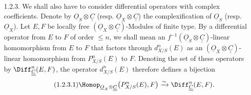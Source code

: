 1.2.3. We shall also have to consider differential operators with complex coefficients. Denote by $\underline{O}_S\otimes\underline{\underline{C}}$ (resp. $\underline{O}_X\otimes\underline{\underline{C}}$) the complexification of $\underline{O}_S$ (resp. $\underline{O}_X$). Let $E,F$ be locally free $(\underline{O}_X\otimes\underline{\underline{C}})$-Modules of finite type. By a differential operator from $E$ to $F$ of order $\le n$, we shall mean an $f^{-1}(\underline{O}_S\otimes\underline{\underline{C}})$-linear homomorphism from $E$ to $F$ that factors through $d^n_{X/S}(E)$ as an $(\underline{O}_X\otimes\underline{\underline{C}})$-linear homomorphism from $P^n_{X/S}(E)$ to $F$. Denoting the set of these operators by $\Diff^n_{\underline{\underline{C}}}(E,F)$, the operator $d^n_{X/S}(E)$ therefore defines a bijection
\begin{equation}\tag{1.2.3.1}
  \Homop_{\underline{O}_X\otimes\underline{\underline{C}}}\bigl(P^n_{X/S}(E),F\bigr)
  \xrightarrow{\sim}
  \Diff^n_{\underline{\underline{C}}}(E,F).
\end{equation}

